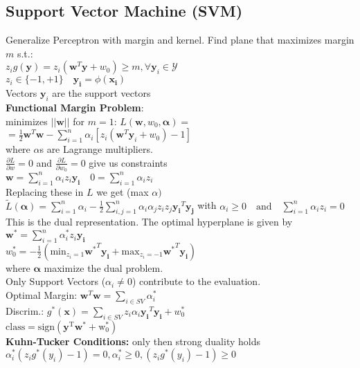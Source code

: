 \subsection*{Support Vector Machine (SVM)}
Generalize Perceptron with margin and kernel.
Find plane that maximizes margin $m$ s.t.:\\
$z_ig(\mathbf{y})=z_i(\mathbf{w}^T\mathbf{y}+w_0)\geq m,\forall \mathbf{y}_i \in \mathcal{Y}$\\
$z_i \in \{-1,+1\}\quad \mathbf{y_i} = \phi(\mathbf{x_i})$\\
Vectors $\mathbf{y}_i$ are the support vectors \\
\textbf{Functional Margin Problem}:\\
minimizes $||\mathbf{w}||$ for $m{=}1$: 
$L(\mathbf{w}, w_0, \mathbf{\alpha}) {=}$\\
$=\frac{1}{2}\mathbf{w}^T\mathbf{w}{-}\sum_{i=1}^n\alpha_i[z_i(\mathbf{w}^T\mathbf{y}_i{}+w_0){-}1]$\\
where $\alpha$s are Lagrange multipliers.\\
$\frac{\partial L}{\partial w} {=} 0$ and $\frac{\partial L}{\partial w_0} {=} 0$ give us constraints\\
$\mathbf{w}=\sum_{i=1}^n\alpha_iz_i\mathbf{y_i} \quad 0=\sum_{i=1}^n\alpha_iz_i$\\
Replacing these in $L$ we get (max $\alpha)$\\
$\tilde{L}(\mathbf{\alpha}){=}\sum_{i=1}^n\alpha_i{-}\frac{1}{2}\sum_{i,j=1}^n\alpha_i\alpha_jz_iz_j\mathbf{y_i}^T\mathbf{y_j}$
with $\alpha_i\geq0\quad\mathrm{and}\quad\sum_{i=1}^n\alpha_iz_i=0$\\
This is the dual representation.
The optimal hyperplane is given by\\
$\mathbf{w^*}=\sum_{i=1}^n\alpha_i^*z_i\mathbf{y_i}$\\
$ w_0^*{=}{-}\frac{1}{2}(\mathrm{min}_{z_i=1}\mathbf{w^*}^T\mathbf{y_i}{+}\mathrm{max}_{z_i=-1}\mathbf{w^*}^T\mathbf{y_i})$\\
where $\mathbf{\alpha}$ maximize the dual problem.\\
Only Support Vectors ($\alpha_i\not=0$) contribute to the evaluation.\\
Optimal Margin: $\mathbf{w}^T\mathbf{w}=\sum_{i\in SV}\alpha_i^*$\\
Discrim.: $g^*(\mathbf{x}){=}\sum_{i\in SV}z_i\alpha_i\mathbf{y_i}^T\mathbf{y_i}{+}w^*_0$\\
$\mathrm{class} = \mathrm{sign(\mathbf{y}^T\mathbf{w}^*+w_0^*)}$ \\
\textbf{Kuhn-Tucker Conditions:} only then strong duality holds\\
$\alpha_i^*(z_ig^*(y_i)-1)= 0, \alpha_i^* \geq 0, (z_ig^*(y_i)-1) \geq 0$


